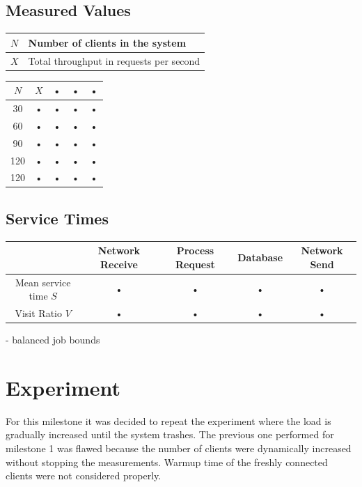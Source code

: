 \documentclass[a4paper]{article}
\begin{document}


\subsection{Measured Values}

\begin{tabular}{|l|l|}
\hline 
$N$ & Number of clients in the system \\ 
\hline 
$X$ & Total throughput in requests per second \\ 
\hline 
\end{tabular} 

\begin{tabular}{|c|c|c|c|c|}
\hline 
$N$ & $X$ & • & • & • \\ 
\hline 
30 & • & • & • & • \\ 
\hline 
60 & • & • & • & • \\ 
\hline 
90 & • & • & • & • \\ 
\hline 
120 & • & • & • & • \\ 
\hline 
120 & • & • & • & • \\ 
\hline 
\end{tabular} 

\subsection{Service Times}

\begin{tabular}{|c|c|c|c|c|}
\hline 
  & Network Receive & Process Request & Database & Network Send \\ 
\hline 
Mean service time $S$ & • & • & • & • \\ 
\hline 
Visit Ratio $V$ & • & • & • & • \\ 

\hline 
\end{tabular} 


- balanced job bounds

\section{Experiment}
\label{sec:experiment}
For this milestone it was decided to repeat the experiment where the load is gradually increased until the system trashes. The previous one performed for milestone 1 was flawed because the number of clients were dynamically increased without stopping the measurements. Warmup time of the freshly connected clients were not considered properly.
\end{document}
